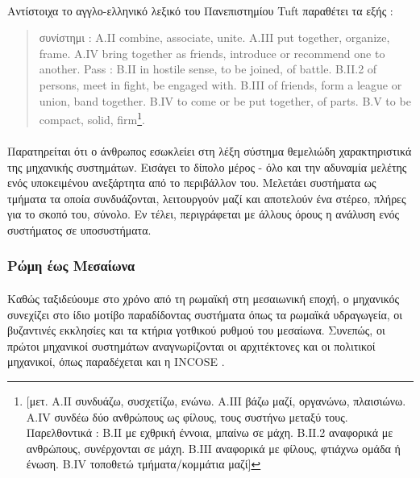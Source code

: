 \documentclass[a4paper,12pt,twoside]{report}
\begin{document}
			\paragraph{}{Αντίστοιχα το αγγλο-ελληνικό λεξικό του Πανεπιστημίου Tuft \cite{AGreek-EnglishLexiconHenryGeorgeLiddellRobertScott} παραθέτει τα εξής :
			\begin{quote}
				συνίστημι : A.II combine, associate, unite. A.III put together, organize, frame. A.IV bring together as friends, introduce or recommend one to another. Pass : B.II in hostile sense, to be joined, of battle. B.II.2 of persons, meet in fight, be engaged with. B.III of friends, form a league or union, band together. B.IV to come or be put together, of parts. B.V to be compact, solid, firm\footnote{[μετ. Α.ΙΙ συνδυάζω, συσχετίζω, ενώνω. Α.ΙΙΙ βάζω μαζί, οργανώνω, πλαισιώνω. Α.IV συνδέω δύο ανθρώπους ως φίλους, τους συστήνω μεταξύ τους. Παρελθοντικά : Β.ΙΙ με εχθρική έννοια, μπαίνω σε μάχη. Β.ΙΙ.2 αναφορικά με ανθρώπους, συνέρχονται σε μάχη. Β.ΙΙΙ αναφορικά με φίλους, φτιάχνω ομάδα ή ένωση. Β.IV τοποθετώ τμήματα/κομμάτια μαζί]}.
			\end{quote} 
			}
			\paragraph{}{Παρατηρείται ότι ο άνθρωπος εσωκλείει στη λέξη σύστημα θεμελιώδη χαρακτηριστικά της μηχανικής συστημάτων. Εισάγει το δίπολο μέρος - όλο και την αδυναμία μελέτης ενός υποκειμένου ανεξάρτητα από το περιβάλλον του. Μελετάει συστήματα ως τμήματα τα οποία συνδυάζονται, λειτουργούν μαζί και αποτελούν ένα στέρεο, πλήρες για το σκοπό του, σύνολο. Εν τέλει, περιγράφεται με άλλους όρους η ανάλυση ενός συστήματος σε υποσυστήματα.
			}
			
		\subsubsection{Ρώμη έως Μεσαίωνα}		
			\paragraph{}{Καθώς ταξιδεύουμε στο χρόνο από τη ρωμαϊκή στη μεσαιωνική εποχή, ο μηχανικός συνεχίζει στο ίδιο μοτίβο παραδίδοντας συστήματα όπως τα ρωμαϊκά υδραγωγεία, οι βυζαντινές εκκλησίες και τα κτήρια γοτθικού ρυθμού του μεσαίωνα. Συνεπώς, οι πρώτοι μηχανικοί συστημάτων αναγνωρίζονται οι αρχιτέκτονες και οι πολιτικοί μηχανικοί, όπως παραδέχεται και η \acrshort{INCOSE} \cite{OriginAndEvolutionOfSystemsEngineering}.
			}
\end{document}
